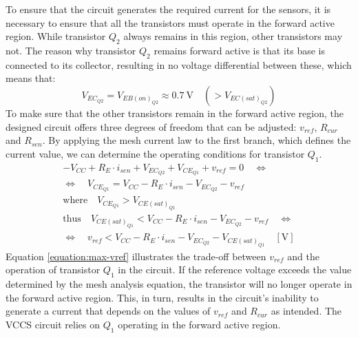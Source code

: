 To ensure that the circuit generates the required current for the sensors, it is necessary to ensure that all the transistors must operate in the forward active region. While transistor $Q_2$ always remains in this region, other transistors may not. The reason why transistor $Q_2$ remains forward active is that its base is connected to its collector, resulting in no voltage differential between these, which means that:
\begin{equation}
    \nonumber V_{EC_{Q2}} = V_{EB(on)_{Q2}} \approx 0.7~\mathrm{V} \quad \left(> V_{EC(sat)_{Q2}}\right)
\end{equation}
\noindent
To make sure that the other transistors remain in the forward active region, the designed circuit offers three degrees of freedom that can be adjusted: $v_{ref}$, $R_{cur}$ and $R_{sen}$. By applying the mesh current law to the first branch, which defines the current value, we can determine the operating conditions for transistor $Q_1$.
\vspace{-3mm}
\begin{gather}
    \nonumber -V_{CC} + R_E \cdot i_{sen} + V_{EC_{Q2}} + V_{CE_{Q1}} + v_{ref} = 0 \quad \Leftrightarrow \\
    \nonumber \Leftrightarrow \quad V_{CE_{Q1}} = V_{CC} - R_E \cdot i_{sen} - V_{EC_{Q2}} - v_{ref} \\
    \nonumber \textrm{where} \quad V_{CE_{Q1}} > V_{CE(sat)_{Q1}} \\
    \nonumber \textrm{thus} \quad V_{CE(sat)_{Q1}} < V_{CC} - R_E \cdot i_{sen} - V_{EC_{Q2}} - v_{ref} \quad \Leftrightarrow \\
\label{equation:max-vref}
    \Leftrightarrow \quad v_{ref} < V_{CC} - R_E \cdot i_{sen} - V_{EC_{Q2}} - V_{CE(sat)_{Q1}} \quad [\mathrm{V}]
\end{gather}
\noindent
Equation \ref{equation:max-vref} illustrates the trade-off between $v_{ref}$ and the operation of transistor $Q_1$ in the circuit. If the reference voltage exceeds the value determined by the mesh analysis equation, the transistor will no longer operate in the forward active region. This, in turn, results in the circuit's inability to generate a current that depends on the values of $v_{ref}$ and $R_{cur}$ as intended. The \ac{VCCS} circuit relies on $Q_1$ operating in the forward active region. 

